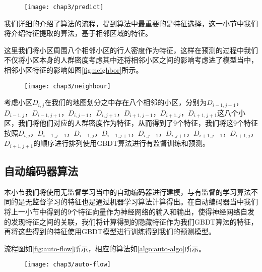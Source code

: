 \begin{figure}[!htp]
    \centering
    \texttt{[image: chap3/predict]}
\end{figure}

我们详细的介绍了算法的流程，提到算法中最重要的是特征选择，这一小节中我们将介绍特征提取的算法，基于相邻区域的特征。

这里我们将小区周围八个相邻小区的行人密度作为特征，这样在预测的过程中我们不仅将小区本身的人群密度考虑其中还将相邻小区之间的影响考虑进了模型当中，相邻小区特征的影响如图\ref{fig:neighbor}所示。

\begin{figure}[!htp]
    \centering
    \texttt{[image: chap3/neighbour]}
\end{figure}

考虑小区$D_{i,j}$在我们的地图划分之中存在八个相邻的小区，分别为$D_{i-1,j-1}$，$D_{i-1,j}$，$D_{i-1,j+1}$，$D_{i,j-1}$，$D_{i,j+1}$，$D_{i+1,j-1}$，$D_{i+1,j}$，$D_{i+1,j+1}$这八个小区，我们将他们对应的人群密度作为特征，从而得到了9个特征，我们将这9个特征按照$D_{i,j}$，$D_{i-1,j-1}$，$D_{i-1,j}$，$D_{i-1,j+1}$，$D_{i,j-1}$，$D_{i,j+1}$，$D_{i+1,j-1}$，$D_{i+1,j}$，$D_{i+1,j+1}$的顺序进行排列使用GBDT算法进行有监督训练和预测。

\subsection{自动编码器算法}

本小节我们将使用无监督学习当中的自动编码器进行建模，与有监督的学习算法不同的是无监督学习的特征也是通过机器学习算法计算得出。在自动编码器当中我们将上一小节中得到的9个特征向量作为神经网络的输入和输出，使得神经网络自发的发现特征之间的关联，我们将计算得到的隐藏特征作为我们GBDT算法的特征，再将这些得到的特征使用GBDT模型进行训练得到我们的预测模型。

流程图如\ref{fig:auto-flow}所示，相应的算法如\ref{algo:auto-algo}所示。

\begin{figure}[!htp]
    \centering
    \texttt{[image: chap3/auto-flow]}
\end{figure}


